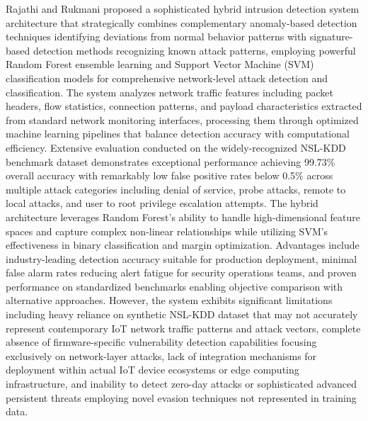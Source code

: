 Rajathi and Rukmani proposed \cite{rajathi2025hybrid} a sophisticated hybrid intrusion detection system architecture that strategically combines complementary anomaly-based detection techniques identifying deviations from normal behavior patterns with signature-based detection methods recognizing known attack patterns, employing powerful Random Forest ensemble learning and Support Vector Machine (SVM) classification models for comprehensive network-level attack detection and classification. The system analyzes network traffic features including packet headers, flow statistics, connection patterns, and payload characteristics extracted from standard network monitoring interfaces, processing them through optimized machine learning pipelines that balance detection accuracy with computational efficiency. Extensive evaluation conducted on the widely-recognized NSL-KDD benchmark dataset demonstrates exceptional performance achieving 99.73\% overall accuracy with remarkably low false positive rates below 0.5\% across multiple attack categories including denial of service, probe attacks, remote to local attacks, and user to root privilege escalation attempts. The hybrid architecture leverages Random Forest's ability to handle high-dimensional feature spaces and capture complex non-linear relationships while utilizing SVM's effectiveness in binary classification and margin optimization. Advantages include industry-leading detection accuracy suitable for production deployment, minimal false alarm rates reducing alert fatigue for security operations teams, and proven performance on standardized benchmarks enabling objective comparison with alternative approaches. However, the system exhibits significant limitations including heavy reliance on synthetic NSL-KDD dataset that may not accurately represent contemporary IoT network traffic patterns and attack vectors, complete absence of firmware-specific vulnerability detection capabilities focusing exclusively on network-layer attacks, lack of integration mechanisms for deployment within actual IoT device ecosystems or edge computing infrastructure, and inability to detect zero-day attacks or sophisticated advanced persistent threats employing novel evasion techniques not represented in training data.
